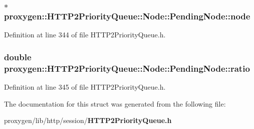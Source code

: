 \subsubsection[{node}]{$\ast$ proxygen\+::\+H\+T\+T\+P2\+Priority\+Queue\+::\+Node\+::\+Pending\+Node\+::node}\label{structproxygen_1_1HTTP2PriorityQueue_1_1Node_1_1PendingNode_af4a6181b7bd45b8e880036bd081e1847}


Definition at line 344 of file H\+T\+T\+P2\+Priority\+Queue.\+h.

\subsubsection[{ratio}]{\setlength{\rightskip}{0pt plus 5cm}double proxygen\+::\+H\+T\+T\+P2\+Priority\+Queue\+::\+Node\+::\+Pending\+Node\+::ratio}\label{structproxygen_1_1HTTP2PriorityQueue_1_1Node_1_1PendingNode_a741f53260c7d43022caf0d5dd59a4b96}


Definition at line 345 of file H\+T\+T\+P2\+Priority\+Queue.\+h.



The documentation for this struct was generated from the following file\+:\begin{DoxyCompactItemize}
\item 
proxygen/lib/http/session/{\bf H\+T\+T\+P2\+Priority\+Queue.\+h}\end{DoxyCompactItemize}

